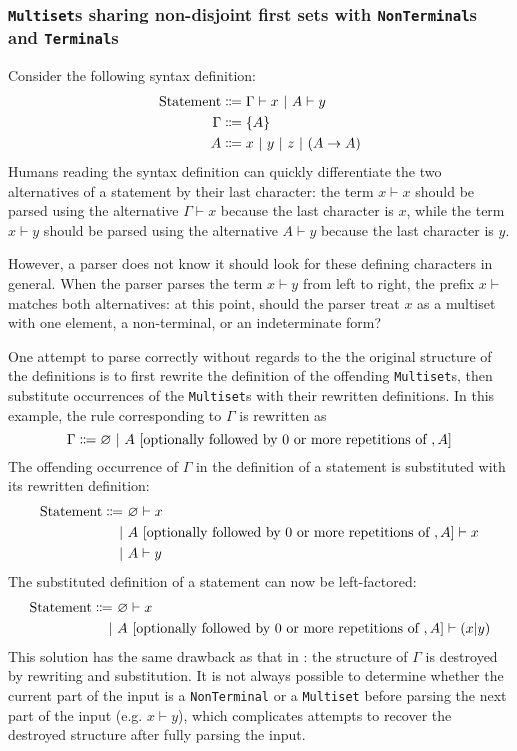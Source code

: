 \subsubsection{\texorpdfstring{\lstinline{Multiset}}{Multiset}s sharing non-disjoint first sets with \texorpdfstring{\lstinline{NonTerminal}}{NonTerminal}s and \texorpdfstring{\lstinline{Terminal}}{Terminal}s}
Consider the following syntax definition:
\begin{align*}
    \text{Statement} &\Coloneqq \Gamma \vdash x \ |\  A \vdash y \\
    \Gamma &\Coloneqq \{ A \} \\
    A &\Coloneqq x \ |\  y \ |\  z \ |\  (A \to A)
\end{align*}
Humans reading the syntax definition can quickly differentiate the two alternatives of a statement by their last character: the term $x \vdash x$ should be parsed using the alternative $\Gamma \vdash x$ because the last character is $x$, while the term $x \vdash y$ should be parsed using the alternative $A \vdash y$ because the last character is $y$.

However, a parser does not know it should look for these defining characters in general. When the parser parses the term $x \vdash y$ from left to right, the prefix $x \vdash$ matches both alternatives: at this point, should the parser treat $x$ as a multiset with one element, a non-terminal, or an indeterminate form?

One attempt to parse correctly without regards to the the original structure of the definitions is to first rewrite the definition of the offending \lstinline{Multiset}s, then substitute occurrences of the \lstinline{Multiset}s with their rewritten definitions. In this example, the rule corresponding to $\Gamma$ is rewritten as
\[
    \Gamma \Coloneqq \varnothing \ |\  A \ [\text{optionally followed by 0 or more repetitions of },A]
\]
The offending occurrence of $\Gamma$ in the definition of a statement is substituted with its rewritten definition:
\begin{align*}
    \text{Statement} \Coloneqq \ &\varnothing \vdash x \\
    \ |\  &A \ [\text{optionally followed by 0 or more repetitions of },A] \vdash x \\
    \ |\  &A \vdash y
\end{align*}
The substituted definition of a statement can now be left-factored:
\begin{align*}
    \text{Statement} \Coloneqq \ &\varnothing \vdash x \\
    \ |\  &A \ [\text{optionally followed by 0 or more repetitions of },A] \vdash (x|y)
\end{align*}
This solution has the same drawback as that in : the structure of $\Gamma$ is destroyed by rewriting and substitution. It is not always possible to determine whether the current part of the input is a \lstinline{NonTerminal} or a \lstinline{Multiset} before parsing the next part of the input (e.g. $x \vdash y$), which complicates attempts to recover the destroyed structure after fully parsing the input.

